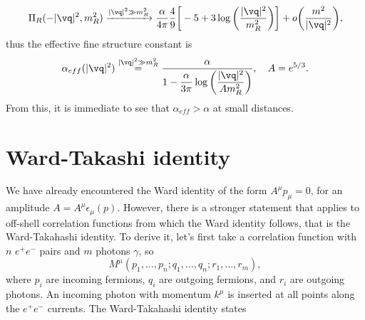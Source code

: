 \begin{equation}
    \Pi_R(-|\vq|^2,m_R^2) \xrightarrow{|\vq|^2 \gg m_R^2} \frac{\alpha}{4\pi}\frac{4}{9}\bigg[-5 + 3\log{\bigg(\frac{|\vq|^2}{m_R^2}\bigg)}\bigg] + o\bigg(\frac{m^2}{|\vq|^2}\bigg),
\end{equation}
thus the effective fine structure constant is
\begin{equation}
    \alpha_{eff}(|\vq|^2) \overset{|\vq|^2 \gg m_R^2}{=} \frac{\alpha}{1 - \dfrac{\alpha}{3\pi}\log{\bigg(\dfrac{|\vq|^2}{Am_R^2}\bigg)}},\quad A = e^{5/3}.
\end{equation}
From this, it is immediate to see that $\alpha_{eff} > \alpha$ at small distances. 

\section{Ward-Takashi identity}
We have already encountered the Ward identity of the form $A^\mu p_\mu = 0$, for an amplitude $A = A^\mu\epsilon_\mu(p)$. However, there is a stronger statement that applies to off-shell correlation functions from which the Ward identity follows, that is the Ward-Takahashi identity. To derive it, let's first take a correlation function with $n$ $e^+e^-$ pairs and $m$ photons $\gamma$, so
\begin{equation}
    M^\mu(p_1,\dots,p_n;q_1,\dots,q_n;r_1,\dots,r_m),
\end{equation}
where $p_i$ are incoming fermions, $q_i$ are outgoing fermions, and $r_i$ are outgoing photons. An incoming photon with momentum $k^\mu$ is inserted at all points along the $e^+e^-$ currents. The Ward-Takahashi identity states
